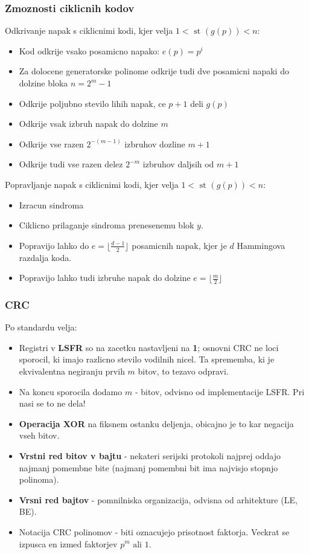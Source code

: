 \documentclass{article}
\begin{document}
\begin{multicols}{4}
\subsubsection{Zmoznosti ciklicnih kodov}
Odkrivanje napak s ciklicnimi kodi, kjer velja $1 < \text{ st }(g(p)) < n$:
\begin{itemize}
    \item Kod odkrije vsako posamicno napako: $e(p) = p^i$
    \item Za dolocene generatorske polinome odkrije tudi dve posamicni napaki do dolzine bloka $n = 2^m -1$
    \item Odkrije poljubno stevilo lihih napak, ce $p + 1$ deli $g(p)$
    \item Odkrije vsak izbruh napak do dolzine $m$
    \item Odkrije vse razen $2^{-(m-1)}$ izbruhov dozline $m + 1$
    \item Odkrije tudi vse razen delez $2^{-m}$ izbruhov daljsih od $m + 1$
\end{itemize}
Popravljanje napak s ciklicnimi kodi, kjer velja $1 < \text{ st }(g(p)) < n$:
\begin{itemize}
    \item Izracun sindroma
    \item Ciklicno prilaganje sindroma prenesenemu blok $y$.
    \item Popravijo lahko do $e = \lfloor \frac{d-1}{2} \rfloor$ posamicnih napak, kjer je
        $d$ Hammingova razdalja koda.
    \item Popravijo lahko tudi izbruhe napak do dolzine $e = \lfloor \frac{m}{2} \rfloor$
\end{itemize}

\subsubsection{CRC}
Po standardu velja:
\begin{itemize}
    \item Registri v \textbf{LSFR} so na zacetku nastavljeni na \textbf{1}; osnovni CRC ne loci sporocil,
        ki imajo razlicno stevilo vodilnih nicel. Ta sprememba, ki je ekvivalentna negiranju prvih $m$ bitov,
        to tezavo odpravi.
    \item Na koncu sporocila dodamo $m$ - bitov, odvisno od implementacije LSFR. Pri nasi se to ne dela!
    \item \textbf{Operacija XOR} na fiksnem ostanku deljenja, obicajno je to kar negacija vseh bitov.
    \item \textbf{Vrstni red bitov v bajtu} - nekateri serijski protokoli najprej oddajo najmanj pomembne bite
        (najmanj pomembni bit ima najvisjo stopnjo polinoma).
    \item \textbf{Vrsni red bajtov} - pomnilniska organizacija, odvisna od arhitekture (LE, BE).
    \item Notacija CRC polinomov - biti oznacujejo prisotnost faktorja. Veckrat se izpusca en izmed faktorjev $p^m \text{ ali } 1$.
\end{itemize}


\end{multicols}
\end{document}
